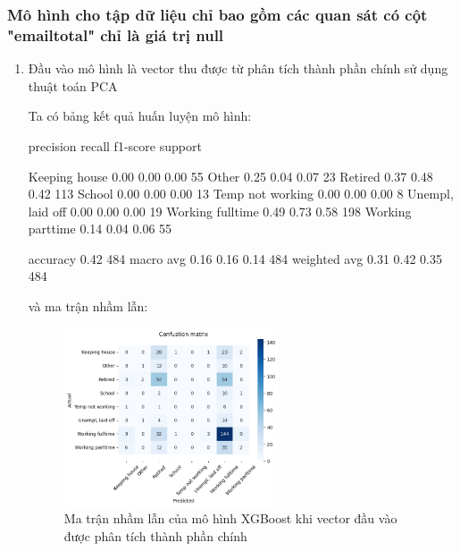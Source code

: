 \subsubsection{Mô hình cho tập dữ liệu chỉ bao gồm các quan sát có cột "emailtotal" chỉ là giá trị null}


\begin{enumerate}[label=(\alph*)]
    \item Đầu vào mô hình là vector thu được từ phân tích thành phần chính sử dụng thuật toán PCA
    
    Ta có bảng kết quả huấn luyện mô hình:

    \begin{python}
                    precision    recall  f1-score   support

   Keeping house       0.00      0.00      0.00        55
           Other       0.25      0.04      0.07        23
         Retired       0.37      0.48      0.42       113
          School       0.00      0.00      0.00        13
Temp not working       0.00      0.00      0.00         8
Unempl, laid off       0.00      0.00      0.00        19
Working fulltime       0.49      0.73      0.58       198
Working parttime       0.14      0.04      0.06        55

        accuracy                           0.42       484
       macro avg       0.16      0.16      0.14       484
    weighted avg       0.31      0.42      0.35       484
    \end{python}

    và ma trận nhầm lẫn:

    \begin{figure}[H]
        \centering
        \includegraphics[width=0.6\textwidth]{figures/Thanh/Models/XGBoost/With_null_models_confusion_matrix_XGBoost_PCA_features.png}
        \caption{Ma trận nhầm lẫn của mô hình XGBoost khi vector đầu vào được phân tích thành phần chính}
        \label{fig:With_null_models_confusion_matrix_XGBoost_PCA_features}
    \end{figure}


\end{enumerate}
